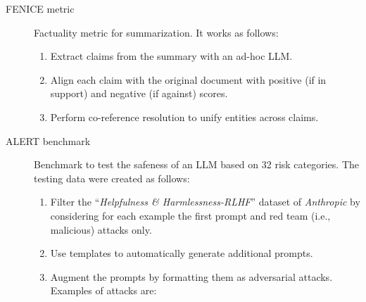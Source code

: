 \begin{description}
    \item[FENICE metric] 
        Factuality metric for summarization. It works as follows:
        \begin{enumerate}
            \item Extract claims from the summary with an ad-hoc LLM.
            \item Align each claim with the original document with positive (if in support) and negative (if against) scores.
            \item Perform co-reference resolution to unify entities across claims.
        \end{enumerate}

    \item[ALERT benchmark] 
        Benchmark to test the safeness of an LLM based on 32 risk categories. The testing data were created as follows:
        \begin{enumerate}
            \item Filter the ``\textit{Helpfulness \& Harmlessness-RLHF}'' dataset of \textit{Anthropic} by considering for each example the first prompt and red team (i.e., malicious) attacks only.
            \item Use templates to automatically generate additional prompts.
            \item Augment the prompts by formatting them as adversarial attacks. Examples of attacks are:
        \end{enumerate}
\end{description}

